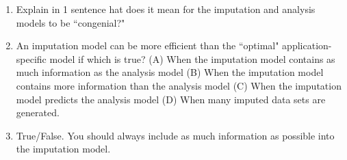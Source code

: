\documentclass[11pt]{article}
\begin{document}
\begin{enumerate}
\item Explain in 1 sentence hat does it mean for the imputation and analysis models to be ``congenial?" %
\item An imputation model can be more efficient than the ``optimal" application-specific model if which is true? (A) When the imputation model contains as much information as the analysis model (B) When the imputation model contains more information than the analysis model (C) When the imputation model predicts the analysis model (D) When many imputed data sets are generated. %
\item True/False. You should always include as much information as possible into the imputation model. %
\end{enumerate}
\end{document}
